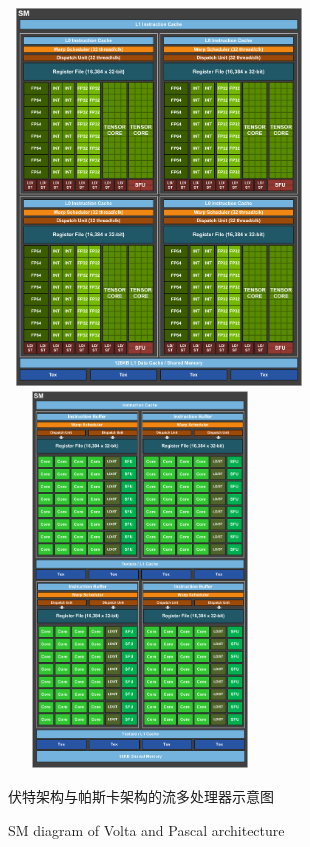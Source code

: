 \begin{figure}
	\centering
	\includegraphics[width=8cm, height=10cm]{figures/VoltaSM.jpg}
	\includegraphics[width=7cm, height=10cm]{figures/PascalSM.jpg}
	\renewcommand{\thefigure}{\arabic{section}-\arabic{figure} }
	\renewcommand{\figurename}{图}
	\caption{伏特架构与帕斯卡架构的流多处理器示意图}
	\addtocounter{figure}{-1}
	\renewcommand{\thefigure}{\arabic{section}-\arabic{figure} }
	\renewcommand{\figurename}{Figure}
	\caption{SM diagram of Volta and Pascal architecture}
	\label{Fig.VoltaPascal}
\end{figure}
